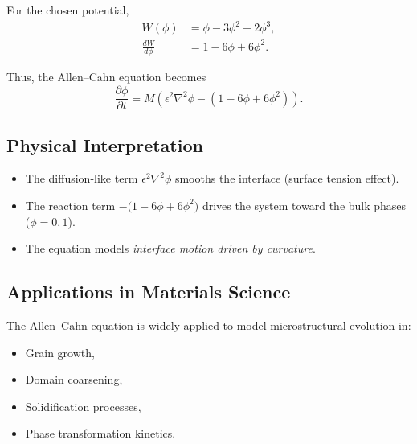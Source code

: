 \documentclass[12pt,a4paper]{article}
\begin{document}
For the chosen potential,
\begin{align}
W(\phi) &= \phi - 3\phi^2 + 2\phi^3, \\[6pt]
\frac{dW}{d\phi} &= 1 - 6\phi + 6\phi^2.
\end{align}

Thus, the Allen--Cahn equation becomes
\begin{equation}
\frac{\partial \phi}{\partial t} =
M \left( \epsilon^2 \nabla^2 \phi - \left( 1 - 6\phi + 6\phi^2 \right) \right).
\end{equation}

\subsection*{Physical Interpretation}

\begin{itemize}
    \item The diffusion-like term \(\epsilon^2 \nabla^2 \phi\) smooths the interface (surface tension effect).
    \item The reaction term \(-\big(1 - 6\phi + 6\phi^2\big)\) drives the system toward the bulk phases (\(\phi = 0, 1\)).
    \item The equation models \emph{interface motion driven by curvature}.
\end{itemize}

\subsection*{Applications in Materials Science}

The Allen--Cahn equation is widely applied to model microstructural evolution in:
\begin{itemize}
    \item Grain growth,
    \item Domain coarsening,
    \item Solidification processes,
    \item Phase transformation kinetics.
\end{itemize}
\end{document}
